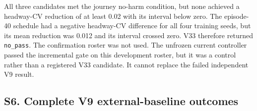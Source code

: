 \documentclass[10pt]{article}
\begin{document}
All three candidates met the journey no-harm condition, but none
achieved a headway-CV reduction of at least 0.02 with its interval below
zero. The episode-40 schedule had a negative headway-CV difference for
all four training seeds, but its mean reduction was 0.012 and its
interval crossed zero. V33 therefore returned \texttt{no\_pass}. The
confirmation roster was not used. The unfrozen current controller passed
the incremental gate on this development roster, but it was a control
rather than a registered V33 candidate. It cannot replace the failed
independent V9 result.

\subsection{S6. Complete V9 external-baseline
outcomes}\label{s6.-complete-v9-external-baseline-outcomes}
\end{document}
